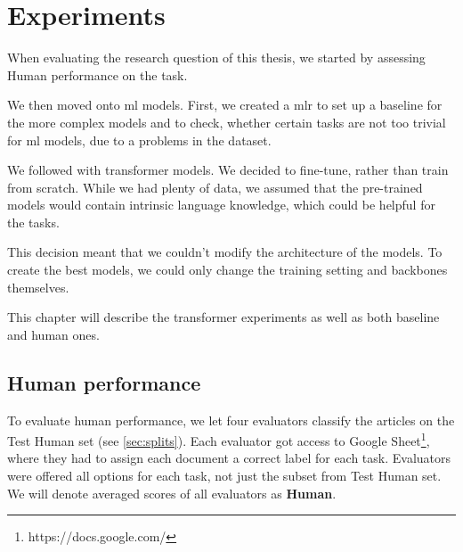 \chapter{Experiments}
\label{chap:experiments}
When evaluating the research question of this thesis,
we started by assessing Human performance on the task.

We then moved onto \ac{ml} models. 
First, we created a \ac{mlr} to set up
a baseline for the more complex models and to check,
whether certain tasks are not too trivial for \ac{ml} models,
due to a problems in the dataset.

We followed with transformer models. We decided
to fine-tune, rather than train from scratch. While
we had plenty of data, we assumed that the pre-trained
models would contain intrinsic language knowledge,
which could be helpful for the tasks.

This decision meant that we couldn't modify
the architecture of the models. To create the
best models, we could only change the training setting
and backbones themselves.

This chapter will describe the transformer experiments
as well as both baseline and human ones.

\section{Human performance}
\label{sec:human}
To evaluate human performance, we let four evaluators classify the articles on 
the Test Human set (see \autoref{sec:splits}).
Each evaluator got access to Google Sheet\footnote{https://docs.google.com/},
where they had to assign each document a correct label for each task.
Evaluators were offered all options for each task, not just the subset from Test Human set.
We will denote averaged scores of all evaluators as \textbf{Human}.

